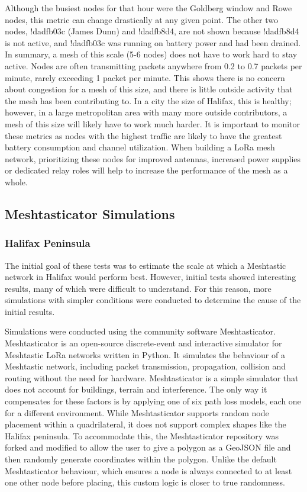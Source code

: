 \documentclass[11pt]{article}
\begin{document}
Although the busiest nodes for that hour were the Goldberg window and Rowe nodes, this metric can change drastically at any given point. The other two nodes, !dadfb03c (James Dunn) and !dadfb8d4, are not shown because !dadfb8d4 is not active, and !dadfb03c was running on battery power and had been drained. In summary, a mesh of this scale (5-6 nodes) does not have to work hard to stay active. Nodes are often transmitting packets anywhere from 0.2 to 0.7 packets per minute, rarely exceeding 1 packet per minute. This shows there is no concern about congestion for a mesh of this size, and there is little outside activity that the mesh has been contributing to. In a city the size of Halifax, this is healthy; however, in a large metropolitan area with many more outside contributors, a mesh of this size will likely have to work much harder. It is important to monitor these metrics as nodes with the highest traffic are likely to have the greatest battery consumption and channel utilization. When building a LoRa mesh network, prioritizing these nodes for improved antennas, increased power supplies or dedicated relay roles will help to increase the performance of the mesh as a whole.

\FloatBarrier
\subsection{Meshtasticator Simulations}

\subsubsection{Halifax Peninsula}

The initial goal of these tests was to estimate the scale at which a Meshtastic network in Halifax would perform best. However, initial tests showed interesting results, many of which were difficult to understand. For this reason, more simulations with simpler conditions were conducted to determine the cause of the initial results.

Simulations were conducted using the community software Meshtasticator. Meshtasticator is an open-source discrete-event and interactive simulator for Meshtastic LoRa networks written in Python. It simulates the behaviour of a Meshtastic network, including packet transmission, propagation, collision and routing without the need for hardware. Meshtasticator is a simple simulator that does not account for buildings, terrain and interference. The only way it compensates for these factors is by applying one of six path loss models, each one for a different environment. While Meshtasticator supports random node placement within a quadrilateral, it does not support complex shapes like the Halifax peninsula. To accommodate this, the Meshtasticator repository was forked and modified to allow the user to give a polygon as a GeoJSON file and then randomly generate coordinates within the polygon. Unlike the default Meshtasticator behaviour, which ensures a node is always connected to at least one other node before placing, this custom logic is closer to true randomness. 
\end{document}
